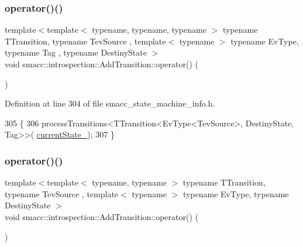 \subsubsection{\texorpdfstring{operator()()}{operator()()}\hspace{0.1cm}{\footnotesize\ttfamily [1/4]}}
{\footnotesize\ttfamily template$<$template$<$ typename, typename, typename $>$ typename T\+Transition, typename Tev\+Source , template$<$ typename $>$ typename Ev\+Type, typename Tag , typename Destiny\+State $>$ \\
void smacc\+::introspection\+::\+Add\+Transition\+::operator() (\begin{DoxyParamCaption}\item[{T\+Transition$<$ Ev\+Type$<$ Tev\+Source $>$, Destiny\+State, Tag $>$}]{ }\end{DoxyParamCaption})}



Definition at line 304 of file smacc\+\_\+state\+\_\+machine\+\_\+info.\+h.


\begin{DoxyCode}
305 \{
306     processTransitions<TTransition<EvType<TevSource>, DestinyState, Tag>>(
      \hyperlink{structsmacc_1_1introspection_1_1AddTransition_a56fd9b1bdf6761bbe5258dc915481f4b}{currentState\_});
307 \}
\end{DoxyCode}
\mbox{\label{structsmacc_1_1introspection_1_1AddTransition_ae418fea0a96b2b2da60fb2f42a8c99cf}} 
\subsubsection{\texorpdfstring{operator()()}{operator()()}\hspace{0.1cm}{\footnotesize\ttfamily [2/4]}}
{\footnotesize\ttfamily template$<$template$<$ typename, typename $>$ typename T\+Transition, typename Tev\+Source , template$<$ typename $>$ typename Ev\+Type, typename Destiny\+State $>$ \\
void smacc\+::introspection\+::\+Add\+Transition\+::operator() (\begin{DoxyParamCaption}\item[{T\+Transition$<$ Ev\+Type$<$ Tev\+Source $>$, Destiny\+State $>$}]{ }\end{DoxyParamCaption})}



